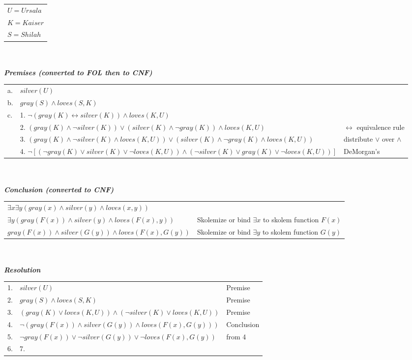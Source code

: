 \documentclass{article}
\begin{document}
\begin{enumerate}
\begin{tabular}{l}
        $U = Ursala$\\
        $K = Kaiser$\\
        $S = Shilah$\\
    \end{tabular}\\\\
    \textit{\textbf{Premises (converted to FOL then to CNF)}}\\
    \begin{tabular}{lll}
        a. & $silver(U)$\\
        b. & $gray(S) \wedge loves(S, K)$\\
        c. & 1. $\neg(gray(K) \leftrightarrow silver(K)) \wedge loves(K, U)$ \\
           & 2. $(gray(K) \wedge \neg silver(K)) \vee (silver(K) \wedge \neg gray(K)) \wedge loves(K, U)$ & $\leftrightarrow$ equivalence rule\\
           & 3. $(gray(K) \wedge \neg silver(K) \wedge loves(K,U)) \vee (silver(K) \wedge \neg gray(K) \wedge loves(K, U))$ & distribute $\vee$ over $\wedge$ \\
           & 4. $\neg[(\neg gray(K) \vee silver(K) \vee \neg loves(K,U)) \wedge (\neg silver(K) \vee gray(K) \vee \neg loves(K, U))]$ & DeMorgan's

    \end{tabular}\\\\
    \textit{\textbf{Conclusion (converted to CNF)}}\\
    \begin{tabular}{ll}
        $\exists x \exists y (gray(x) \wedge silver(y) \wedge loves(x,y))$\\
        $\exists y (gray(F(x)) \wedge silver(y) \wedge loves(F(x),y))$ & Skolemize or bind $\exists x$ to skolem function $F(x)$\\
        $gray(F(x)) \wedge silver(G(y)) \wedge loves(F(x),G(y))$ & Skolemize or bind $\exists y$ to skolem function $G(y)$\\
    \end{tabular}\\\\
    \textit{\textbf{Resolution}}\\
    \begin{tabular}{lll}
        1. &  $silver(U)$ & Premise\\
        2. & $gray(S) \wedge loves(S, K)$ & Premise\\
        3. & $(gray(K) \vee loves(K, U)) \wedge (\neg silver(K) \vee loves(K, U))$ & Premise\\
        4. & $\neg (gray(F(x)) \wedge silver(G(y)) \wedge loves(F(x),G(y)))$ & Conclusion\\
        5. & $\neg gray(F(x)) \vee \neg silver(G(y)) \vee \neg loves(F(x), G(y))$ & from 4\\
        6. &
        7. &


    \end{tabular}

\end{enumerate}
\end{document}
